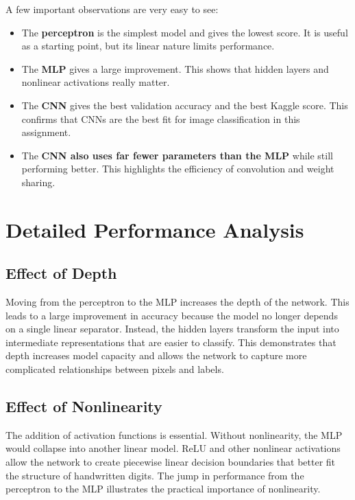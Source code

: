 \documentclass[11pt]{article}
\begin{document}
A few important observations are very easy to see:
\begin{itemize}
    \item The \textbf{perceptron} is the simplest model and gives the lowest score. It is useful as a starting point, but its linear nature limits performance.
    \item The \textbf{MLP} gives a large improvement. This shows that hidden layers and nonlinear activations really matter.
    \item The \textbf{CNN} gives the best validation accuracy and the best Kaggle score. This confirms that CNNs are the best fit for image classification in this assignment.
    \item The \textbf{CNN also uses far fewer parameters than the MLP} while still performing better. This highlights the efficiency of convolution and weight sharing.
\end{itemize}

\section{Detailed Performance Analysis}

\subsection{Effect of Depth}

Moving from the perceptron to the MLP increases the depth of the network. This leads to a large improvement in accuracy because the model no longer depends on a single linear separator. Instead, the hidden layers transform the input into intermediate representations that are easier to classify. This demonstrates that depth increases model capacity and allows the network to capture more complicated relationships between pixels and labels.

\subsection{Effect of Nonlinearity}

The addition of activation functions is essential. Without nonlinearity, the MLP would collapse into another linear model. ReLU and other nonlinear activations allow the network to create piecewise linear decision boundaries that better fit the structure of handwritten digits. The jump in performance from the perceptron to the MLP illustrates the practical importance of nonlinearity.
\end{document}
